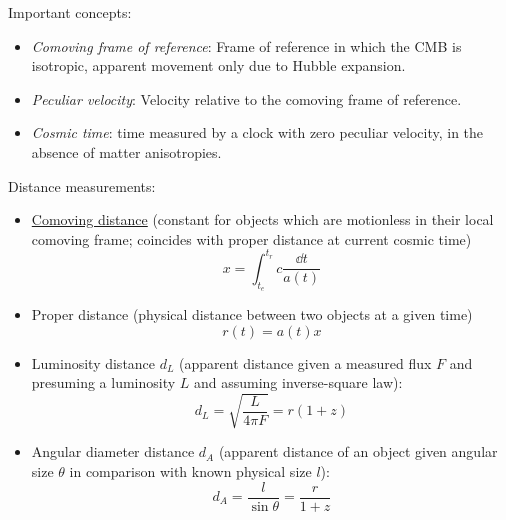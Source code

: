 			\noindent
			Important concepts:
			\begin{itemize}
				\item \emph{Comoving frame of reference}: Frame of reference in which the CMB is isotropic, apparent movement only due to Hubble expansion.
				\item \emph{Peculiar velocity}: Velocity relative to the comoving frame of reference.
				\item \emph{Cosmic time}: time measured by a clock with zero peculiar velocity, in the absence of matter anisotropies.
			\end{itemize}

			\noindent
			Distance measurements:
			\begin{itemize}
				\item \href{https://en.wikipedia.org/wiki/Comoving_and_proper_distances}{Comoving distance} (constant for objects which are motionless in their local comoving frame; coincides with proper distance at current cosmic time)
					\begin{equation}
						x = \int_{t_e}^{t_r} c\frac{\dd t}{a(t)}
					\end{equation}
				\item Proper distance (physical distance between two objects at a given time)
					\begin{equation}
						r(t) = a(t) x
					\end{equation}
				\item Luminosity distance $d_L$ (apparent distance given a measured flux $F$ and presuming a luminosity $L$ and assuming inverse-square law):
					\begin{equation}
						d_L = \sqrt{\frac{L}{4 \pi F}} = r (1+z)
					\end{equation}
				\item Angular diameter distance $d_A$ (apparent distance of an object given angular size $\theta$ in comparison with known physical size $l$):
					\begin{equation}
						d_A = \frac{l}{\sin \theta} = \frac{r}{1+z}
					\end{equation}
			\end{itemize}
